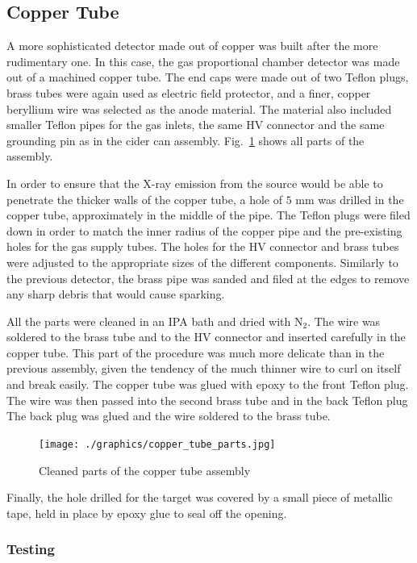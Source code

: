 \subsection{Copper Tube}

\label{sec:copper_construction}
A more sophisticated detector made out of copper was built after the more rudimentary one. In this case, the gas proportional chamber detector was made out of a machined copper tube. The end caps were made out of two Teflon plugs, brass tubes were again used as electric field protector, and a finer, copper beryllium wire was selected as the anode material. The material also included smaller Teflon pipes for the gas inlets, the same HV connector and the same grounding pin as in the cider can assembly. Fig.~\ref{fig:copper_parts} shows all parts of the assembly.

In order to ensure that the X-ray emission from the source would be able to penetrate the thicker walls of the copper tube, a hole of $5$ mm was drilled in the copper tube, approximately in the middle of the pipe. The Teflon plugs were filed down in order to match the inner radius of the copper pipe and the pre-existing holes for the gas supply tubes. The holes for the HV connector and brass tubes were adjusted to the appropriate sizes of the different components. Similarly to the previous detector, the brass pipe was sanded and filed at the edges to remove any sharp debris that would cause sparking.

All the parts were cleaned in an IPA bath and dried with N$_2$. The wire was soldered to the brass tube and to the HV connector and inserted carefully in the copper tube. This part of the procedure was much more delicate than in the previous assembly, given the tendency of the much thinner wire to curl on itself and break easily. The copper tube was glued with epoxy to the front Teflon plug. The wire was then passed into the second brass tube and in the back Teflon plug  The back plug was glued and the wire soldered to the brass tube.

\begin{figure}[htb]
  \centering
  \texttt{[image: ./graphics/copper\_tube\_parts.jpg]}
  \caption{Cleaned parts of the copper tube assembly}
  \label{fig:copper_parts}
\end{figure}

Finally, the hole drilled for the target was covered by a small piece of metallic tape, held in place by epoxy glue to seal off the opening.

\subsubsection{Testing}


